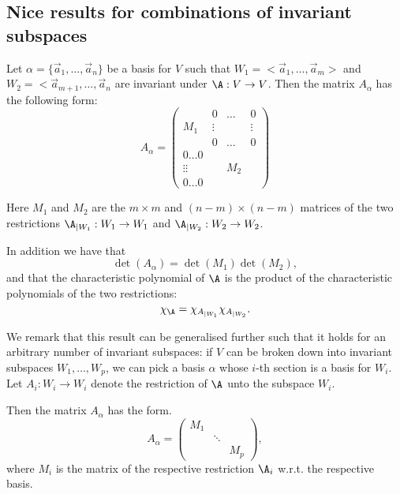 \subsection{Nice results for combinations of invariant subspaces}
\begin{theorem}
    Let $\alpha = \{\vec{a}_1, \dots, \vec{a}_n\}$ be a basis for $V$ such that $W_1 = <\vec{a}_1,\dots,\vec{a}_m>$ and $W_2 = <\vec{a}_{m+1}, \dots, \vec{a}_n$ are invariant under $\A: V \to V$.
    Then the matrix $A_\alpha$ has the following form:
    $$A_\alpha = \begin{pmatrix}
        & 0 & \dots & 0 \\
        M_1 & \vdots & & \vdots\\
            & 0 & \dots & 0 \\
        0 \dots 0 & & \\
        \vdots \vdots & & M_2 & \\
    0 \dots 0&&\end{pmatrix}$$

    Here $M_1$ and $M_2$ are the $m \times m$ and $(n-m) \times (n-m)$ matrices of the two restrictions $\A_{|W_1}: W_1 \to W_1$ and
    $\A_{|W_2}: W_2 \to W_2$.
    
    In addition we have that
    $$\det(A_\alpha) = \det(M_1)\det(M_2),$$
    and that the characteristic polynomial of $\A$ is the product of the characteristic polynomials of the two restrictions:
    $$\chi_\A = \chi_{A_{|W_1}}\chi_{A_{|W_2}}.$$
\end{theorem}

\begin{remark}
    We remark that this result can be generalised further such that it holds
    for an arbitrary number of invariant subspaces: if $V$ can be broken down
    into invariant subspaces $W_1 , \dots,W_p$, we can pick a basis $\alpha$ whose $i$-th
    section is a basis for $W_i$. Let $A_i : W_i \to W_i$ denote the restriction of $\A$
    unto the subspace $W_i$. 

    Then the matrix $A_\alpha$ has the form.
    $$A_\alpha = \begin{pmatrix}
        M_1 & & \\
            &\ddots&\\
            &&M_p\end{pmatrix},$$
            where $M_i$ is the matrix of the respective restriction $\A_i$ w.r.t. the respective basis.
\end{remark}

